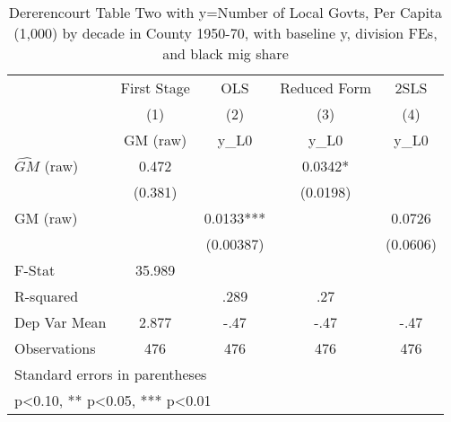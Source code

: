 \begin{table}[htbp]\centering
\def\sym#1{\ifmmode^{#1}\else\(^{#1}\)\fi}
\caption{Dererencourt Table Two with y=Number of Local Govts, Per Capita (1,000) by decade in County 1950-70, with baseline y, division FEs, and black mig share}
\begin{tabular}{l*{4}{c}}
\toprule
                    & First Stage   &         OLS   &Reduced Form   &        2SLS   \\
                    &\multicolumn{1}{c}{(1)}&\multicolumn{1}{c}{(2)}&\multicolumn{1}{c}{(3)}&\multicolumn{1}{c}{(4)}\\
                    &\multicolumn{1}{c}{GM  (raw)}&\multicolumn{1}{c}{y\_L0}&\multicolumn{1}{c}{y\_L0}&\multicolumn{1}{c}{y\_L0}\\
\midrule
$\hat{GM}$ (raw)    &       0.472   &               &      0.0342*  &               \\
                    &     (0.381)   &               &    (0.0198)   &               \\
\addlinespace
GM  (raw)           &               &      0.0133***&               &      0.0726   \\
                    &               &   (0.00387)   &               &    (0.0606)   \\
\midrule
F-Stat              &      35.989   &               &               &               \\
R-squared           &               &        .289   &         .27   &               \\
Dep Var Mean        &       2.877   &        -.47   &        -.47   &        -.47   \\
Observations        &         476   &         476   &         476   &         476   \\
\bottomrule
\multicolumn{5}{l}{\footnotesize Standard errors in parentheses}\\
\multicolumn{5}{l}{\footnotesize * p<0.10, ** p<0.05, *** p<0.01}\\
\end{tabular}
\end{table}
